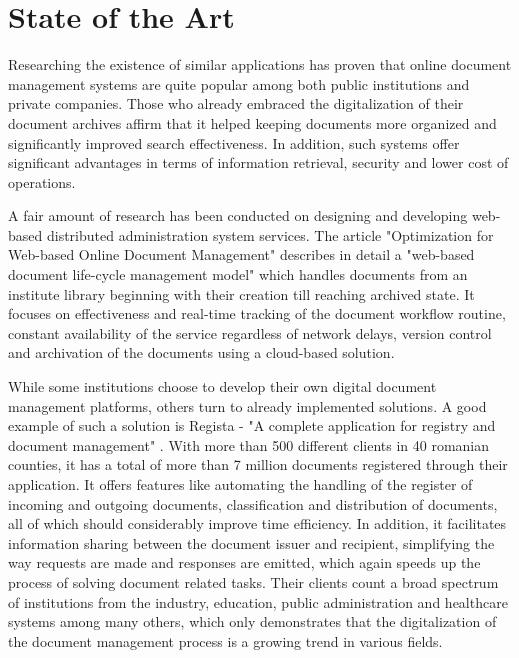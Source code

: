 \chapter{State of the Art}
\label{chapter:stateOfTheArt}

Researching the existence of similar applications has proven that online document management systems are quite popular among both public institutions and private companies. Those who already embraced the digitalization of their document archives affirm that it helped keeping documents more organized and significantly improved search effectiveness. In addition, such systems offer significant advantages in terms of information retrieval, security and lower cost of operations.

A fair amount of research has been conducted on designing and developing web-based distributed administration system services. The article "Optimization for Web-based Online Document Management" \cite{Cheng-2013} describes in detail a "web-based document life-cycle management model" which handles documents from an institute library beginning with their creation till reaching archived state. It focuses on effectiveness and real-time tracking of the document workflow routine, constant availability of the service regardless of network delays, version control and archivation of the documents using a cloud-based solution.

While some institutions choose to develop their own digital document management platforms, others turn to already implemented solutions. A good example of such a solution is Regista - "A complete application for registry and document management" \cite{regista}. With more than 500 different clients in 40 romanian counties, it has a total of more than 7 million documents registered through their application. It offers features like automating the handling of the register of incoming and outgoing documents, classification and distribution of documents, all of which should considerably improve time efficiency. In addition, it facilitates information sharing between the document issuer and recipient, simplifying the way requests are made and responses are emitted, which again speeds up the process of solving document related tasks. Their clients count a broad spectrum of institutions from the industry, education, public administration and healthcare systems among many others, which only demonstrates that the digitalization of the document management process is a growing trend in various fields.


